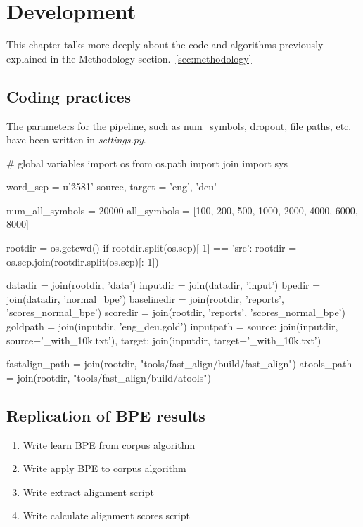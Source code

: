 %
%

\chapter{Development}\label{ch:development}

This chapter talks more deeply about the code and algorithms previously explained in the Methodology section.~\ref{sec:methodology}

\section{Coding practices}

The parameters for the pipeline, such as num\_symbols, dropout, file paths, etc. have been written in \emph{settings.py}.

\begin{python}
# global variables
import os
from os.path import join
import sys

word_sep = u'\u2581'
source, target = 'eng', 'deu'

num_all_symbols = 20000
all_symbols = [100, 200, 500, 1000, 2000, 4000, 6000, 8000]

rootdir = os.getcwd()
if rootdir.split(os.sep)[-1] == 'src':
    rootdir = os.sep.join(rootdir.split(os.sep)[:-1])

datadir = join(rootdir, 'data')
inputdir = join(datadir, 'input')
bpedir = join(datadir, 'normal_bpe')
baselinedir = join(rootdir, 'reports', 'scores_normal_bpe')
scoredir = join(rootdir, 'reports', 'scores_normal_bpe')
goldpath = join(inputdir, 'eng_deu.gold')
inputpath = {source: join(inputdir, source+'_with_10k.txt'),
            target: join(inputdir, target+'_with_10k.txt')}

fastalign_path = join(rootdir, "tools/fast_align/build/fast_align")
atools_path = join(rootdir, "tools/fast_align/build/atools")
\end{python}

\section{Replication of BPE results}

\begin{enumerate}
    \item Write learn BPE from corpus algorithm
    \item Write apply BPE to corpus algorithm
    \item Write extract alignment script
    \item Write calculate alignment scores script
\end{enumerate}

